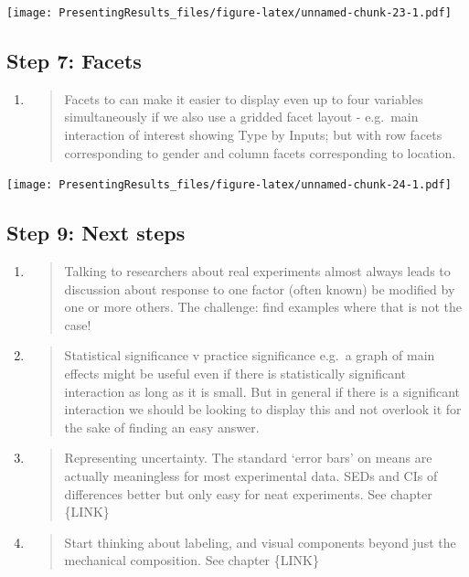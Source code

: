 \documentclass[
  titlepage]{book}
\begin{document}
\texttt{[image: PresentingResults\_files/figure-latex/unnamed-chunk-23-1.pdf]}

\hypertarget{step-7-facets}{%
\subsection{Step 7: Facets}\label{step-7-facets}}

\begin{enumerate}
\def\labelenumi{\alph{enumi}.}
\item
  \begin{quote}
  Facets to can make it easier to display even up to four variables simultaneously if we also use a gridded facet layout - e.g.~main interaction of interest showing Type by Inputs; but with row facets corresponding to gender and column facets corresponding to location.
  \end{quote}
\end{enumerate}

\texttt{[image: PresentingResults\_files/figure-latex/unnamed-chunk-24-1.pdf]}

\hypertarget{step-9-next-steps}{%
\subsection{Step 9: Next steps}\label{step-9-next-steps}}

\begin{enumerate}
\def\labelenumi{\alph{enumi}.}
\item
  \begin{quote}
  Talking to researchers about real experiments almost always leads to discussion about response to one factor (often known) be modified by one or more others. The challenge: find examples where that is not the case!
  \end{quote}
\item
  \begin{quote}
  Statistical significance v practice significance e.g.~a graph of main effects might be useful even if there is statistically significant interaction as long as it is small. But in general if there is a significant interaction we should be looking to display this and not overlook it for the sake of finding an easy answer.
  \end{quote}
\item
  \begin{quote}
  Representing uncertainty. The standard `error bars' on means are actually meaningless for most experimental data. SEDs and CIs of differences better but only easy for neat experiments. See chapter \{LINK\}
  \end{quote}
\item
  \begin{quote}
  Start thinking about labeling, and visual components beyond just the mechanical composition. See chapter \{LINK\}
  \end{quote}
\end{enumerate}
\end{document}
